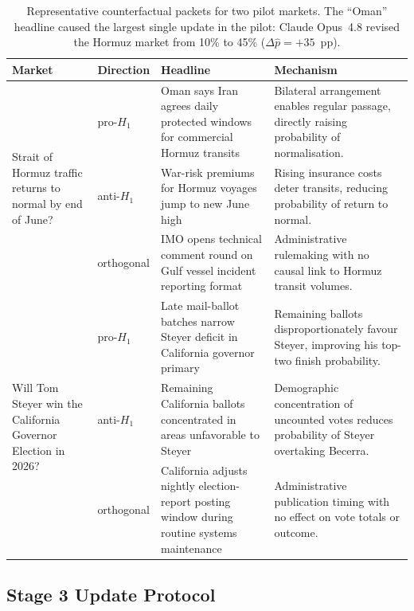 \begin{table}[h]
\centering
\caption{Representative counterfactual packets for two pilot markets.  The ``Oman'' headline
caused the largest single update in the pilot: Claude Opus~4.8 revised the Hormuz market from
10\% to 45\% ($\Delta\hat{p} = +35$~pp).}
\label{tab:cf-example}
\small
\begin{tabular}{p{2.2cm} p{1.4cm} p{5.5cm} p{3.5cm}}
\toprule
\textbf{Market} & \textbf{Direction} & \textbf{Headline} & \textbf{Mechanism} \\
\midrule
\multirow{3}{2.2cm}{Strait of Hormuz traffic returns to normal by end of June?}
  & pro-$H_1$    & Oman says Iran agrees daily protected windows for commercial Hormuz transits
                & Bilateral arrangement enables regular passage, directly raising probability of normalisation. \\
  & anti-$H_1$   & War-risk premiums for Hormuz voyages jump to new June high
                & Rising insurance costs deter transits, reducing probability of return to normal. \\
  & orthogonal   & IMO opens technical comment round on Gulf vessel incident reporting format
                & Administrative rulemaking with no causal link to Hormuz transit volumes. \\
\midrule
\multirow{3}{2.2cm}{Will Tom Steyer win the California Governor Election in 2026?}
  & pro-$H_1$    & Late mail-ballot batches narrow Steyer deficit in California governor primary
                & Remaining ballots disproportionately favour Steyer, improving his top-two finish probability. \\
  & anti-$H_1$   & Remaining California ballots concentrated in areas unfavorable to Steyer
                & Demographic concentration of uncounted votes reduces probability of Steyer overtaking Becerra. \\
  & orthogonal   & California adjusts nightly election-report posting window during routine systems maintenance
                & Administrative publication timing with no effect on vote totals or outcome. \\
\bottomrule
\end{tabular}
\end{table}

\subsection{Stage 3 Update Protocol}
\label{app:update-protocol}

